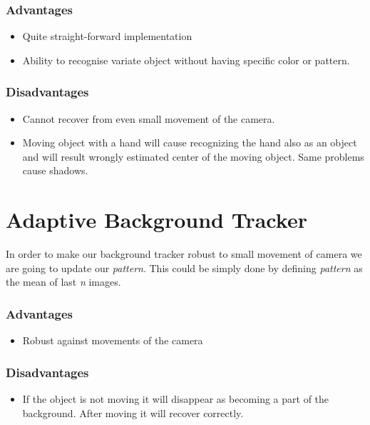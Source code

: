 \subsubsection{Advantages}
\begin{itemize}
\item Quite straight-forward implementation
\item Ability to recognise variate object without having specific color or pattern.
\end{itemize}

\subsubsection{Disadvantages}
\begin{itemize}
\item Cannot recover from even small movement of the camera.
\item Moving object with a hand will cause recognizing the hand also as an object and will result wrongly estimated center of the moving object. Same problems cause shadows.
\end{itemize}


\section{Adaptive Background Tracker}

In order to make our background tracker robust to small movement of camera we
are going to update our \emph{pattern}. This could be simply done by defining \emph{pattern}
as the mean of last \emph{n} images.

\subsubsection{Advantages}
\begin{itemize}
\item Robust against movements of the camera
\end{itemize}

\subsubsection{Disadvantages}
\begin{itemize}
\item If the object is not moving it will disappear as becoming a part of the background. After moving it will recover correctly.
\end{itemize}

